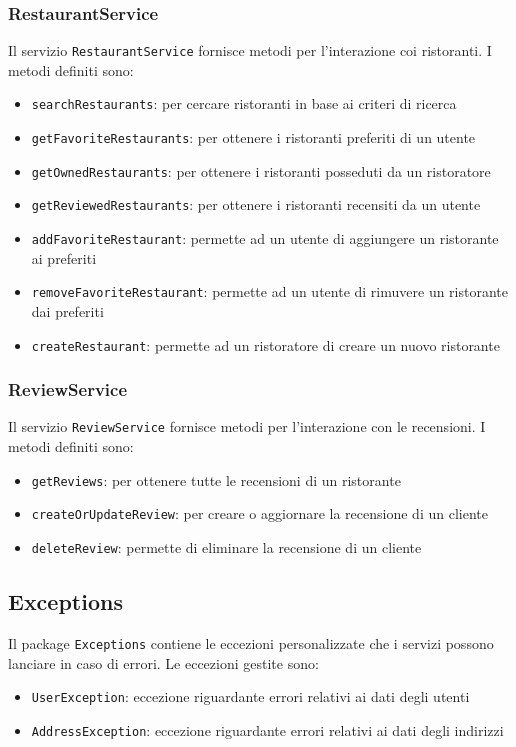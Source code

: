 \subsubsection{RestaurantService}
Il servizio \texttt{RestaurantService} fornisce metodi per 
l'interazione coi ristoranti.
I metodi definiti sono:
\begin{itemize}
    \item \texttt{searchRestaurants}: per cercare ristoranti in base ai criteri di ricerca
    \item \texttt{getFavoriteRestaurants}: per ottenere i ristoranti preferiti di un utente
    \item \texttt{getOwnedRestaurants}: per ottenere i ristoranti posseduti da un ristoratore
    \item \texttt{getReviewedRestaurants}: per ottenere i ristoranti recensiti da un utente
    \item \texttt{addFavoriteRestaurant}: permette ad un utente di aggiungere un ristorante ai preferiti
    \item \texttt{removeFavoriteRestaurant}: permette ad un utente di rimuvere un ristorante dai preferiti
    \item \texttt{createRestaurant}: permette ad un ristoratore di creare un nuovo ristorante
\end{itemize}

\subsubsection{ReviewService}
Il servizio \texttt{ReviewService} fornisce metodi per 
l'interazione con le recensioni.
I metodi definiti sono:
\begin{itemize}
    \item \texttt{getReviews}: per ottenere tutte le recensioni di un ristorante
    \item \texttt{createOrUpdateReview}: per creare o aggiornare la recensione di un cliente
    \item \texttt{deleteReview}: permette di eliminare la recensione di un cliente
\end{itemize}

\subsection{Exceptions}
Il package \texttt{Exceptions} contiene le eccezioni personalizzate 
che i servizi possono lanciare in caso di errori.
Le eccezioni gestite sono:
\begin{itemize}
    \item \texttt{UserException}: eccezione riguardante errori relativi ai dati degli utenti
    \item \texttt{AddressException}: eccezione riguardante errori relativi ai dati degli indirizzi
\end{itemize}
